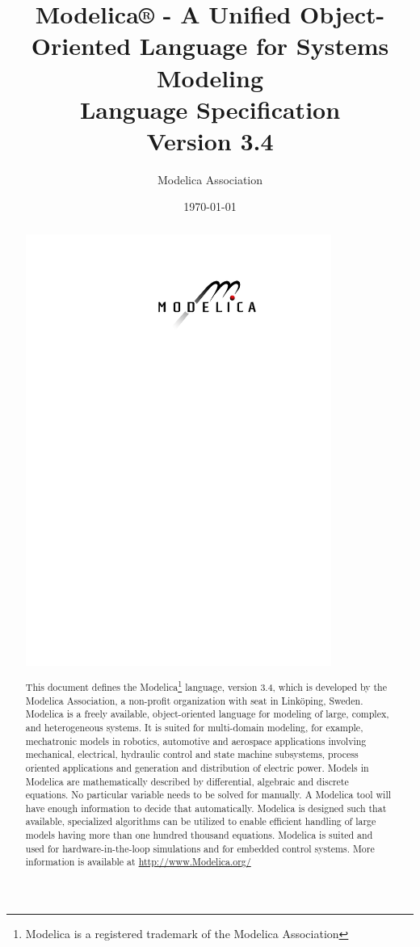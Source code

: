\documentclass[10pt,a4paper]{report}
\title{Modelica® - A Unified Object-Oriented Language for Systems
Modeling\\[2\baselineskip]Language
Specification\\[2\baselineskip]Version 3.4}
\date{\today}
\author{Modelica Association}
\begin{document}
\hypersetup{pageanchor=false}
\maketitle
\begin{abstract}
\begin{center}
\includegraphics[width=10cm]{media/image1}
\end{center}
This document defines the Modelica\footnote{Modelica is a registered
  trademark of the Modelica Association} language, version 3.4, which is
developed by the Modelica Association, a non-profit organization with
seat in Linköping, Sweden. Modelica is a freely available,
object-oriented language for modeling of large, complex, and
heterogeneous systems. It is suited for multi-domain modeling, for
example, mechatronic models in robotics, automotive and aerospace
applications involving mechanical, electrical, hydraulic control and
state machine subsystems, process oriented applications and generation
and distribution of electric power. Models in Modelica are
mathematically described by differential, algebraic and discrete
equations. No particular variable needs to be solved for manually. A
Modelica tool will have enough information to decide that automatically.
Modelica is designed such that available, specialized algorithms can be
utilized to enable efficient handling of large models having more than
one hundred thousand equations. Modelica is suited and used for
hardware-in-the-loop simulations and for embedded control systems. More
information is available at
\href{http://www.modelica.org/}{http://www.Modelica.org/}
\end{abstract}
\end{document}

